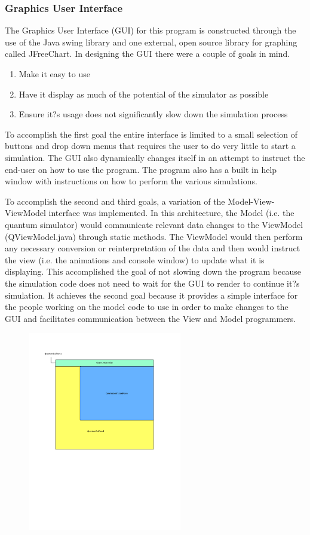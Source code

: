 \documentclass[bibliography=totocnumbered, 10pt]{article}
\theoremstyle{NoticeStyle}
\begin{document}
\subsubsection{Graphics User Interface}
The Graphics User Interface (GUI) for this program is constructed through the use of the Java swing library and one external, open source library for graphing called JFreeChart. In designing the GUI there were a couple of goals in mind. 
\begin{enumerate}
	\item Make it easy to use
	\item Have it display as much of the potential of the simulator as possible
	\item Ensure it?s usage does not significantly slow down the simulation process
\end{enumerate}
To accomplish the first goal the entire interface is limited to a small selection of buttons and drop down menus that requires the user to do very little to start a simulation. The GUI also dynamically changes itself in an attempt to instruct the end-user on how to use the program. The program also has a built in help window with instructions on how to perform the various simulations.

To accomplish the second and third goals, a variation of the Model-View-ViewModel interface was implemented.  In this architecture, the Model (i.e. the quantum simulator) would communicate relevant data changes to the ViewModel (QViewModel.java) through static methods. The ViewModel would then perform any necessary conversion or reinterpretation of the data and then would instruct the view (i.e. the animations and console window) to update what it is displaying. This accomplished the goal of not slowing down the program because the simulation code does not need to wait for the GUI to render to continue it?s simulation. It achieves the second goal because it provides a simple interface for the people working on the model code to use in order to make changes to the GUI and facilitates communication between the View and Model programmers.

\begin{figure}[H]
\centering
\includegraphics[width=0.6\textwidth]{img/GuiDiagram.pdf}
\caption{}
\end{figure}
\end{document}

